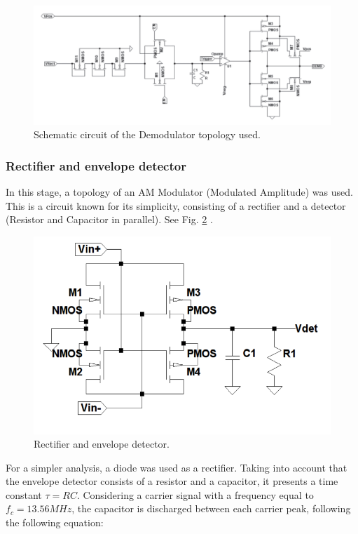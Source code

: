 \documentclass{article} %
\begin{document}
\begin{multicols}{2}
\begin{figure}[H]
\centering
\includegraphics[scale=0.3]{Images/ImagenesTesina/Antecedentes/Demod2.PNG}
\caption{Schematic circuit of the Demodulator topology used.}
\label{fig:Demod2}
\end{figure}

\subsubsection{Rectifier and envelope detector}
In this stage, a topology of an AM Modulator (Modulated Amplitude) was used. This is a circuit known for its simplicity, consisting of a rectifier and a detector (Resistor and Capacitor in parallel). See Fig. \ref{fig:Detect} .
\begin{figure}[H]
\centering
\includegraphics[scale=0.2]{Images/ImagenesTesina/Antecedentes/Detect_RC.png}
\caption{Rectifier and envelope detector.}
\label{fig:Detect}
\end{figure}
For a simpler analysis, a diode was used as a rectifier. Taking into account that the envelope detector consists of a resistor and a capacitor, it presents a time constant  $\tau = RC$. Considering a carrier signal with a frequency equal to  $f_c = 13.56 MHz$, the capacitor is discharged between each carrier peak, following the following equation:


\end{multicols}
\end{document}
